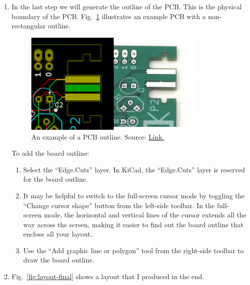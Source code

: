 \documentclass[12pt,letterpaper]{scrartcl}
\begin{document}
\begin{enumerate}
\begin{enumerate}
		\end{enumerate}
	
	\item In the last step we will generate the outline of the PCB. This is the physical boundary of the PCB. Fig.~\ref{fig:pcb-outline-example} illustrates an example PCB with a non-rectangular outline. 
		\begin{figure}[hp]
				\centering
				\includegraphics[width=3.5in]{pcb-outline-example}
				\caption{An example of a PCB outline. Source: \href{https://www.wayneandlayne.com/blog/2013/02/26/kicad-tutorial-pcb-edges/}{Link.}}
				\label{fig:pcb-outline-example}
		\end{figure}
	
	To add the board outline:
		\begin{enumerate}
			\item Select the ``Edge.Cuts'' layer. In KiCad, the ``Edge.Cuts'' layer is reserved for the board outline. 
			
			\item It may be helpful to switch to the full-screen cursor mode by toggling the ``Change cursor shape'' button from the left-side toolbar. In the full-screen mode, the horizontal and vertical lines of the cursor extends all the way across the screen, making it easier to find out the board outline that enclose all your layout. 
			
			\item Use the ``Add graphic line or polygon'' tool from the right-side toolbar to draw the board outline. 
		\end{enumerate}
			
	\item Fig.~\ref{fig:layout-final} shows a layout that I produced in the end. 
	

\end{enumerate}
\end{document}
